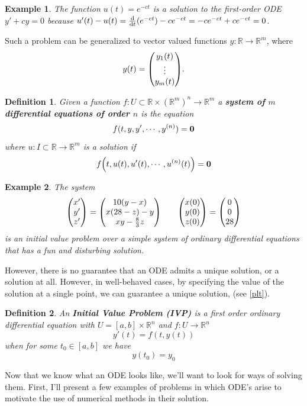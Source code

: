 \documentclass{article}
\newtheorem{definition}{Definition}[section]
\newtheorem{example}{Example}[section]
\newcommand{\R}{\mathbb{R}}
\newcommand{\x}{\vb{x}}
\newcommand{\y}{\vb{y}}
\newcommand{\0}{\vb{0}}
\begin{document}
\begin{example}
  The function $u(t) = e^{-ct}$ is a solution to the first-order ODE $y' + cy = 0$ because $u'(t) - u(t) = \dv{t}(e^{-ct}) - ce^{-ct} = -ce^{-ct} + ce^{-ct} = 0$.
\end{example}

Such a problem can be generalized to vector valued functions $y: \R \to \R^m$, where
\[y(t) = \mqty(y_1(t)\\\vdots\\y_m(t)).\]

\begin{definition}
  Given a function $f: U \subset \R\times(\R^m)^n \to \R^m$ a \textbf{system of $m$ differential equations of order $n$} is the equation
  \[f(t, y, y', \cdots, y^{(n)}) = \0\]
  where $u: I\subset\R \to \R^m$ is a solution if
  \[f\qty(t, u(t), u'(t), \cdots, u^{(n)}(t)) = \0\]
\end{definition}

\begin{example}
  The system
  \[\mqty(x'\\y'\\z') = \mqty(10(y-x)\\x(28-z) - y\\xy - \frac{8}{3} z) \qquad \mqty(x(0)\\y(0)\\z(0)) = \mqty(0\\0\\28)\]
  is an initial value problem over a simple system of ordinary differential equations that has a fun and disturbing solution.
\end{example}

However, there is no guarantee that an ODE admits a unique solution, or a solution at all. However, in well-behaved cases, by specifying the value of the solution at a single point, we can guarantee a unique solution, (see \autoref{plt}).

\begin{definition}
  An \textbf{Initial Value Problem (IVP)} is a first order ordinary differential equation with $U = [a, b]\times\R^n$ and $f: U\to\R^n$
  \[y'(t) = f(t, y(t))\]
  when for some $t_0 \in [a, b]$ we have
  \[y(t_0) = y_0\]
\end{definition}

Now that we know what an ODE looks like, we'll want to look for ways of solving them. First, I'll present a few examples of problems in which ODE's arise to motivate the use of numerical methods in their solution.
\end{document}
